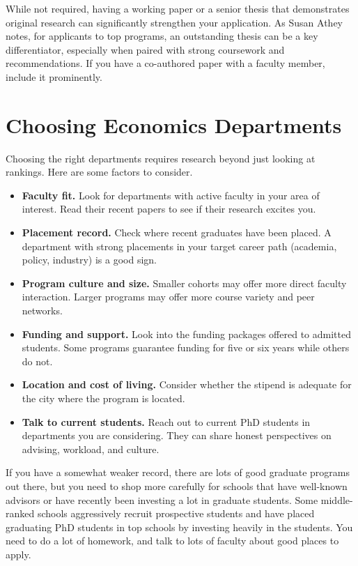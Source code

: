 \documentclass[11pt, letterpaper]{article}
\begin{document}
\begin{tipbox}
While not required, having a working paper or a senior thesis that demonstrates original research can significantly strengthen your application. As Susan Athey notes, for applicants to top programs, an outstanding thesis can be a key differentiator, especially when paired with strong coursework and recommendations. If you have a co-authored paper with a faculty member, include it prominently.
\end{tipbox}


\section{Choosing Economics Departments}

Choosing the right departments requires research beyond just looking at rankings. Here are some factors to consider.

\begin{itemize}[leftmargin=*, itemsep=2pt]
    \item \textbf{Faculty fit.} Look for departments with active faculty in your area of interest. Read their recent papers to see if their research excites you.
    \item \textbf{Placement record.} Check where recent graduates have been placed. A department with strong placements in your target career path (academia, policy, industry) is a good sign.
    \item \textbf{Program culture and size.} Smaller cohorts may offer more direct faculty interaction. Larger programs may offer more course variety and peer networks.
    \item \textbf{Funding and support.} Look into the funding packages offered to admitted students. Some programs guarantee funding for five or six years while others do not.
    \item \textbf{Location and cost of living.} Consider whether the stipend is adequate for the city where the program is located.
    \item \textbf{Talk to current students.} Reach out to current PhD students in departments you are considering. They can share honest perspectives on advising, workload, and culture.
\end{itemize}

\begin{tipbox}
If you have a somewhat weaker record, there are lots of good graduate programs out there, but you need to shop more carefully for schools that have well-known advisors or have recently been investing a lot in graduate students. Some middle-ranked schools aggressively recruit prospective students and have placed graduating PhD students in top schools by investing heavily in the students. You need to do a lot of homework, and talk to lots of faculty about good places to apply.
\end{tipbox}
\end{document}
